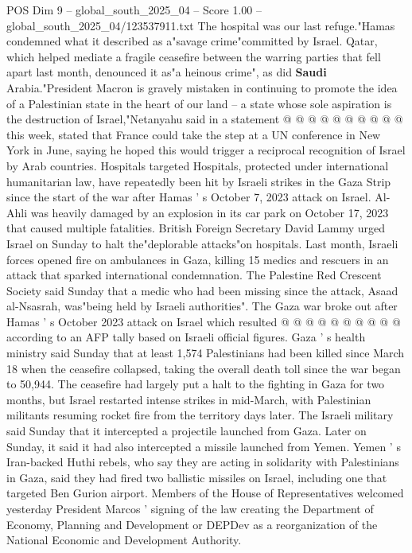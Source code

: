 \begin{textsample}{POS Dim 9 – global\_south\_2025\_04 – Score 1.00 – global\_south\_2025\_04/123537911.txt}
The hospital was our last refuge."Hamas condemned what it described as a"savage crime"committed by Israel.
Qatar, which helped mediate a fragile ceasefire between the warring parties that fell apart last month, denounced it as"a heinous crime", as did \textbf{Saudi} Arabia."President Macron is gravely mistaken in continuing to promote the idea of a Palestinian state in the heart of our land -- a state whose sole aspiration is the destruction of Israel,"Netanyahu said in a statement @ @ @ @ @ @ @ @ @ @ this week, stated that France could take the step at a UN conference in New York in June, saying he hoped this would trigger a reciprocal recognition of Israel by Arab countries.
Hospitals targeted Hospitals, protected under international humanitarian law, have repeatedly been hit by Israeli strikes in the Gaza Strip since the start of the war after Hamas ' s October 7, 2023 attack on Israel.
Al-Ahli was heavily damaged by an explosion in its car park on October 17, 2023 that caused multiple fatalities.
British Foreign Secretary David Lammy urged Israel on Sunday to halt the"deplorable attacks"on hospitals.
Last month, Israeli forces opened fire on ambulances in Gaza, killing 15 medics and rescuers in an attack that sparked international condemnation.
The Palestine Red Crescent Society said Sunday that a medic who had been missing since the attack, Asaad al-Nsasrah, was"being held by Israeli authorities".
The Gaza war broke out after Hamas ' s October 2023 attack on Israel which resulted @ @ @ @ @ @ @ @ @ @ according to an AFP tally based on Israeli official figures.
Gaza ' s health ministry said Sunday that at least 1,574 Palestinians had been killed since March 18 when the ceasefire collapsed, taking the overall death toll since the war began to 50,944.
The ceasefire had largely put a halt to the fighting in Gaza for two months, but Israel restarted intense strikes in mid-March, with Palestinian militants resuming rocket fire from the territory days later.
The Israeli military said Sunday that it intercepted a projectile launched from Gaza.
Later on Sunday, it said it had also intercepted a missile launched from Yemen.
Yemen ' s Iran-backed Huthi rebels, who say they are acting in solidarity with Palestinians in Gaza, said they had fired two ballistic missiles on Israel, including one that targeted Ben Gurion airport.
Members of the House of Representatives welcomed yesterday President Marcos ' signing of the law creating the Department of Economy, Planning and Development or DEPDev as a reorganization of the National Economic and Development Authority.

\end{textsample}
